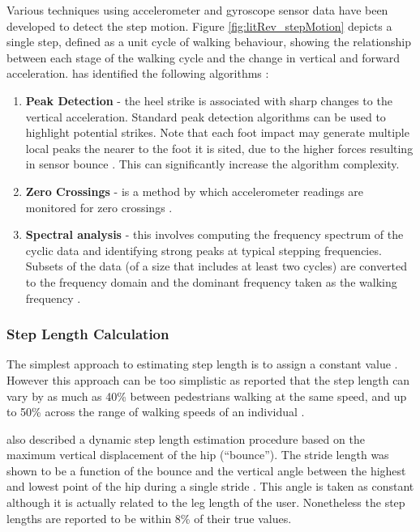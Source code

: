             Various techniques using accelerometer and gyroscope sensor data have been developed to detect the step motion. Figure \ref{fig:litRev_stepMotion} depicts a single step, defined as a unit cycle of walking behaviour, showing the relationship between each stage of the walking cycle and the change in vertical and forward acceleration. \citeauthor{harle2013PIndoor} has identified the following algorithms \cite{harle2013PIndoor}:
            \begin{enumerate}
            	\item \textbf{Peak Detection} - the heel strike is associated with sharp changes to the vertical acceleration. Standard peak detection algorithms can be used to highlight potential strikes. Note that each foot impact may generate multiple local peaks the nearer to the foot it is sited, due to the higher forces resulting in sensor bounce  \cite{ying2007automatic}. This can significantly increase the algorithm complexity.
               	\item \textbf{Zero Crossings} - is a method by which accelerometer readings are monitored for zero crossings \cite{goyal2011strap}.
                \item \textbf{Spectral analysis} - this involves computing the frequency spectrum of the cyclic data and identifying strong peaks at typical stepping frequencies. Subsets of the data (of a size that includes at least two cycles) are converted to the frequency domain and the dominant frequency taken as the walking frequency \cite{levi1996dead}.
			\end{enumerate}
            
            \subsubsection{Step Length Calculation}
            The simplest approach to estimating step length is to assign a constant value \cite{harle2013PIndoor}. However this approach can be too simplistic as \citeauthor{weinberg2002using}  reported that the step length can vary by as much as 40\% between pedestrians walking at the same speed, and up to 50\% across the range of walking speeds of an individual \cite{weinberg2002using}.
            
            \citeauthor{weinberg2002using} also described a dynamic step length estimation procedure based on the maximum vertical displacement of the hip (“bounce”). The stride length was shown to be a function of the bounce and the vertical angle between the highest and lowest point of the hip during a single stride \cite{weinberg2002using}. This angle is taken as constant although it is actually related to the leg length of the user. Nonetheless the step lengths are reported to be within 8\% of their true values.
            
